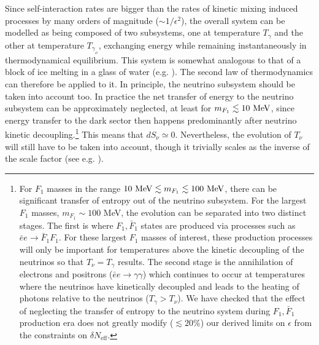 \documentclass[12pt]{article}
\begin{document}
Since self-interaction rates are bigger than the rates of kinetic mixing
induced processes by many orders of magnitude ($\sim 1/\epsilon ^2$),
the overall
system can be modelled as being composed of two subsystems, one at
temperature $T _{\gamma}$ and the other at temperature $T _{\gamma
_{_D}}$, exchanging
energy while remaining instantaneously in thermodynamical equilibrium.
This system is somewhat analogous to that of a block of ice melting in a
glass of water
(e.g. \cite{feynman}). The second law of thermodynamics can therefore be
applied to it. In principle, the neutrino subsystem should be taken into
account too.
In practice the net transfer of energy to the neutrino subsystem can be
approximately neglected, at least for $m _{F_1} \lesssim 10 \ {\rm
MeV}$, since energy
transfer to the dark sector then happens predominantly after neutrino
kinetic decoupling.\footnote{For $F_1$ masses in the range $10 \ {\rm
MeV} \lesssim m _{F_1} \lesssim 100 \ {\rm MeV}$, there can be
significant transfer of entropy out of 
the neutrino subsystem. For the largest $F_1$ masses, $m_{F_1} \sim 100$
MeV, the evolution can be separated into 
two distinct stages. The first is where $F_1, \bar F_1$ states are
produced via processes such as $\bar e e \to \bar F_1 F_1$.  
For these largest $F_1$ masses of interest, these production processes
will only be important for 
temperatures above the kinetic decoupling of the neutrinos so that
$T_\nu = T_\gamma$ results. The second stage is the annihilation
of electrons and positrons ($\bar e e \to \gamma \gamma$) which
continues to occur at temperatures where the neutrinos have kinetically
decoupled and leads
to the heating of photons relative to the neutrinos ($T_\gamma >
T_\nu$). 
We have checked that
the effect of neglecting the transfer of entropy to the neutrino system
during $F_1, \bar F_1$ production
era does not greatly modify
($\lesssim 20\%$)
our derived limits on $\epsilon$ from the constraints on $\delta
N_{\text{eff}}$.}
This means that $dS _{\nu} \simeq 0$. Nevertheless, the evolution of
$T _{\nu}$ will still have to be taken into account, though it trivially
scales as the inverse of the scale factor (see e.g.
\cite{earlyuniverse}).
\end{document}
